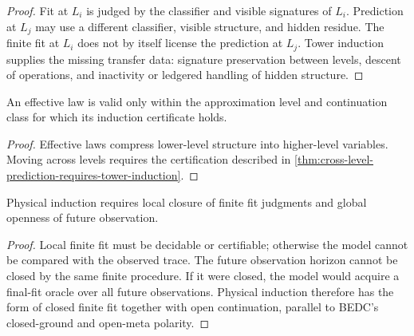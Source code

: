 \begin{proof}
Fit at $L_i$ is judged by the classifier and visible signatures of $L_i$. Prediction at $L_j$ may use a different classifier, visible structure, and hidden residue. The finite fit at $L_i$ does not by itself license the prediction at $L_j$. Tower induction supplies the missing transfer data: signature preservation between levels, descent of operations, and inactivity or ledgered handling of hidden structure.
\end{proof}

\begin{corollary}
\label{cor:effective-laws-level-indexed-induction}
An effective law is valid only within the approximation level and continuation class for which its induction certificate holds.
\end{corollary}

\begin{proof}
Effective laws compress lower-level structure into higher-level variables. Moving across levels requires the certification described in \autoref{thm:cross-level-prediction-requires-tower-induction}.
\end{proof}

\begin{theorem}
\label{thm:physical-induction-closed-ground-open-continuation}
Physical induction requires local closure of finite fit judgments and global openness of future observation.
\end{theorem}

\begin{proof}
Local finite fit must be decidable or certifiable; otherwise the model cannot be compared with the observed trace. The future observation horizon cannot be closed by the same finite procedure. If it were closed, the model would acquire a final-fit oracle over all future observations. Physical induction therefore has the form of closed finite fit together with open continuation, parallel to BEDC's closed-ground and open-meta polarity.
\end{proof}

